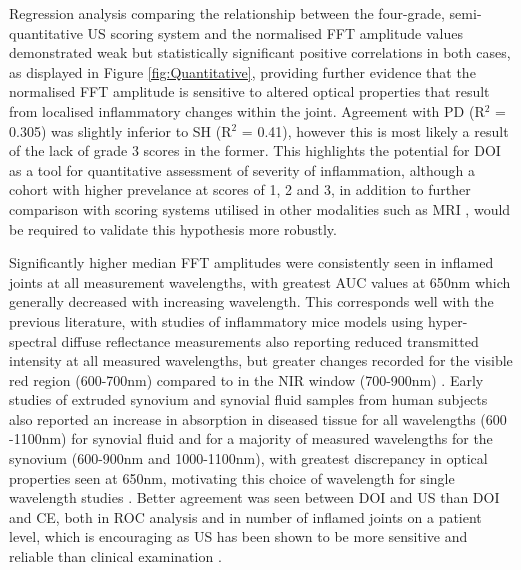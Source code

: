 \documentclass[twoside]{bhamthesis}
\theoremstyle{definition}
\begin{document}
Regression analysis comparing the relationship between the four-grade, semi-quantitative US scoring system and the normalised FFT amplitude values demonstrated weak but statistically significant positive correlations in both cases, as displayed in Figure \ref{fig:Quantitative}, providing further evidence that the normalised FFT amplitude is sensitive to altered optical properties that result from localised inflammatory changes within the joint. Agreement with PD (R$^2$ = 0.305) was slightly inferior to SH (R$^2$ = 0.41), however this is most likely a result of the lack of grade 3 scores in the former. This highlights the potential for DOI as a tool for quantitative assessment of severity of inflammation, although a cohort with higher prevelance at scores of 1, 2 and 3, in addition to further comparison with scoring systems utilised in other modalities such as MRI \cite{ostergaard2003omeract}, would be required to validate this hypothesis more robustly. 

Significantly higher median FFT amplitudes were consistently seen in inflamed joints at all measurement wavelengths, with greatest AUC values at 650nm which generally decreased with increasing wavelength. This corresponds well with the previous literature, with studies of inflammatory mice models using hyper-spectral diffuse reflectance measurements also reporting reduced transmitted intensity at all measured wavelengths, but greater changes recorded for the visible red region (600-700nm) compared to in the NIR window (700-900nm) \cite{glinton2017diagnosing}. Early studies of extruded synovium and synovial fluid samples from human subjects also reported an increase in absorption in diseased tissue for all wavelengths (600 -1100nm) for synovial fluid and for a majority of measured wavelengths for the synovium (600-900nm and 1000-1100nm)\cite{beuthan1996diagnosis}, with greatest discrepancy in optical properties seen at 650nm, motivating this choice of wavelength for single wavelength studies \cite{hielscher2004sagittal}. Better agreement was seen between DOI and US than DOI and CE, both in ROC analysis and in number of inflamed joints on a patient level, which is encouraging as US has been shown to be more sensitive and reliable than clinical examination \cite{wakefield2004should,scheel2006prospective,naredo2005assessment}.
\end{document}
